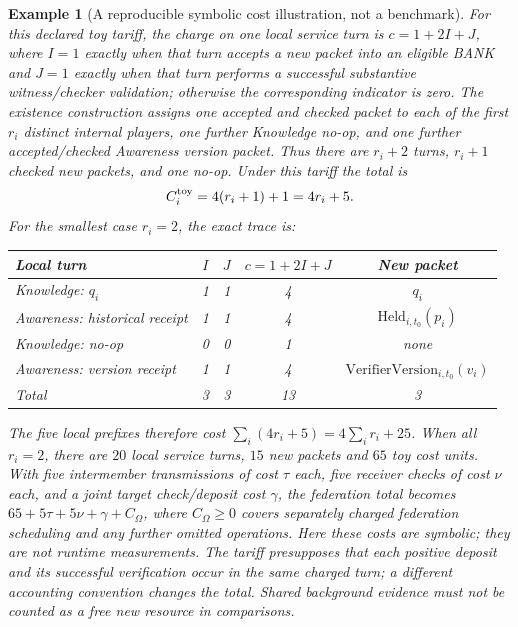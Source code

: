 \documentclass[11pt]{article}
\newtheorem{example}[theorem]{Example}
\begin{document}
\begin{example}[A reproducible symbolic cost illustration, not a benchmark]
For this \emph{declared toy tariff}, the charge on one local service turn is $c=1+2I+J$, where $I=1$ exactly when that turn accepts a new packet into an eligible BANK and $J=1$ exactly when that turn performs a successful substantive witness/checker validation; otherwise the corresponding indicator is zero. The existence construction assigns one accepted and checked packet to each of the first $r_i$ distinct internal players, one further Knowledge no-op, and one further accepted/checked Awareness version packet. Thus there are $r_i+2$ turns, $r_i+1$ checked new packets, and one no-op. Under this tariff the total is
\[
C_i^{\rm toy}=4(r_i+1)+1=4r_i+5.
\]
For the smallest case $r_i=2$, the exact trace is:
\begin{center}\small
\begin{tabular}{@{}lccc c@{}}\toprule
Local turn & $I$ & $J$ & $c=1+2I+J$ & New packet\\\midrule
Knowledge: $q_i$ & 1 & 1 & 4 & $q_i$\\
Awareness: historical receipt & 1 & 1 & 4 & $\mathrm{Held}_{i,t_0}(p_i)$\\
Knowledge: no-op & 0 & 0 & 1 & none\\
Awareness: version receipt & 1 & 1 & 4 & $\mathrm{VerifierVersion}_{i,t_0}(v_i)$\\\midrule
Total & 3 & 3 & 13 & 3\\\bottomrule
\end{tabular}
\end{center}
The five local prefixes therefore cost $\sum_i(4r_i+5)=4\sum_i r_i+25$. When all $r_i=2$, there are $20$ local service turns, $15$ new packets and $65$ toy cost units. With five intermember transmissions of cost $\tau$ each, five receiver checks of cost $\nu$ each, and a joint target check/deposit cost $\gamma$, the federation total becomes $65+5\tau+5\nu+\gamma+C_{\Omega}$, where $C_{\Omega}\ge0$ covers separately charged federation scheduling and any further omitted operations. Here these costs are symbolic; they are not runtime measurements. The tariff presupposes that each positive deposit and its successful verification occur in the same charged turn; a different accounting convention changes the total. Shared background evidence must not be counted as a free new resource in comparisons.
\end{example}
\end{document}
